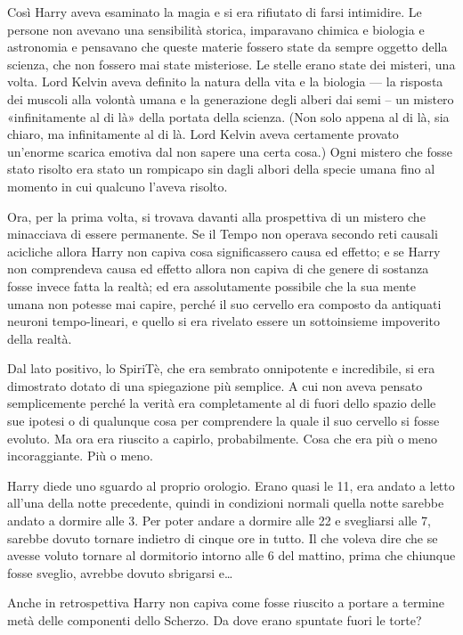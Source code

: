 Così Harry aveva esaminato la magia e si era rifiutato di farsi intimidire. Le persone non avevano una sensibilità storica, imparavano chimica e biologia e astronomia e pensavano che queste materie fossero state da sempre oggetto della scienza, che non fossero mai state misteriose. Le stelle erano state dei misteri, una volta. Lord Kelvin aveva definito la natura della vita e la biologia — la risposta dei muscoli alla volontà umana e la generazione degli alberi dai semi – un mistero «infinitamente al di là» della portata della scienza. (Non solo appena al di là, sia chiaro, ma infinitamente al di là. Lord Kelvin aveva certamente provato un’enorme scarica emotiva dal non sapere una certa cosa.) Ogni mistero che fosse stato risolto era stato un rompicapo sin dagli albori della specie umana fino al momento in cui qualcuno l’aveva risolto.

Ora, per la prima volta, si trovava davanti alla prospettiva di un mistero che minacciava di essere permanente. Se il Tempo non operava secondo reti causali acicliche allora Harry non capiva cosa significassero causa ed effetto; e se Harry non comprendeva causa ed effetto allora non capiva di che genere di sostanza fosse invece fatta la realtà; ed era assolutamente possibile che la sua mente umana non potesse mai capire, perché il suo cervello era composto da antiquati neuroni tempo-lineari, e quello si era rivelato essere un sottoinsieme impoverito della realtà.

Dal lato positivo, lo SpiriTè, che era sembrato onnipotente e incredibile, si era dimostrato dotato di una spiegazione più semplice. A cui non aveva pensato semplicemente perché la verità era completamente al di fuori dello spazio delle sue ipotesi o di qualunque cosa per comprendere la quale il suo cervello si fosse evoluto. Ma ora era riuscito a capirlo, probabilmente. Cosa che era più o meno incoraggiante. Più o meno.

Harry diede uno sguardo al proprio orologio. Erano quasi le 11, era andato a letto all’una della notte precedente, quindi in condizioni normali quella notte sarebbe andato a dormire alle 3. Per poter andare a dormire alle 22 e svegliarsi alle 7, sarebbe dovuto tornare indietro di cinque ore in tutto. Il che voleva dire che se avesse voluto tornare al dormitorio intorno alle 6 del mattino, prima che chiunque fosse sveglio, avrebbe dovuto sbrigarsi e…

Anche in retrospettiva Harry non capiva come fosse riuscito a portare a termine metà delle componenti dello Scherzo. Da dove erano spuntate fuori le torte?

